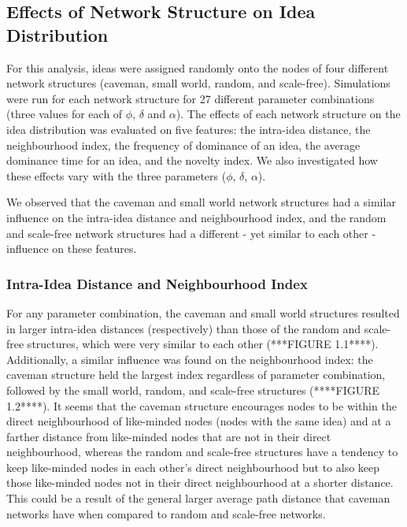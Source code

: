 

\subsection{Effects of Network Structure on Idea Distribution}

For this analysis, ideas were assigned randomly onto the nodes of four different network structures (caveman, small world, random, and scale-free). Simulations were run for each network structure for 27 different parameter combinations (three values for each of $\phi$, $\delta$ and $\alpha$). The effects of each network structure on the idea distribution was evaluated on five features: the intra-idea distance, the neighbourhood index, the frequency of dominance of an idea, the average dominance time for an idea, and the novelty index. We also investigated how these effects vary with the three parameters ($\phi$, $\delta$, $\alpha$).

We observed that the caveman and small world network structures had a similar influence on the intra-idea distance and neighbourhood index, and the random and scale-free network structures had a different - yet similar to each other - influence on these features.

\subsubsection{Intra-Idea Distance and Neighbourhood Index}

For any parameter combination, the caveman and small world structures resulted in larger intra-idea distances (respectively) than those of the random and scale-free structures, which were very similar to each other (***FIGURE 1.1****). Additionally, a similar influence was found on the neighbourhood index: the caveman structure held the largest index regardless of parameter combination, followed by the small world, random, and scale-free structures (****FIGURE 1.2****). It seems that the caveman structure encourages nodes to be within the direct neighbourhood of like-minded nodes (nodes with the same idea) and at a farther distance from like-minded nodes that are not in their direct neighbourhood, whereas the random and scale-free structures have a tendency to keep like-minded nodes in each other's direct neighbourhood but to also keep those like-minded nodes not in their direct neighbourhood at a shorter distance. This could be a result of the general larger average path distance that caveman networks have when compared to random and scale-free networks.


